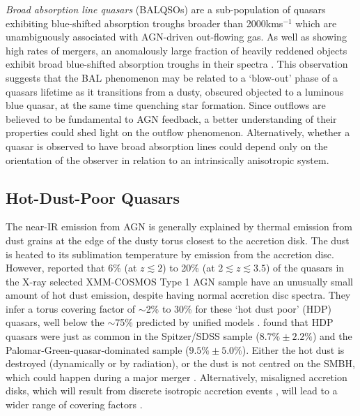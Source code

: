 {\it Broad absorption line quasars} (BALQSOs) are a sub-population of quasars exhibiting blue-shifted absorption troughs broader than 2000kms$^{-1}$ \citep{weymann91} which are unambiguously associated with AGN-driven out-flowing gas. 
As well as showing high rates of mergers, an anomalously large fraction of heavily reddened objects exhibit broad blue-shifted absorption troughs in their spectra \citep{urrutia09, glikman12}. 
This observation suggests that the BAL phenomenon may be related to a `blow-out' phase of a quasars lifetime as it transitions from a dusty, obscured objected to a luminous blue quasar, at the same time quenching star formation. Since outflows are believed to be fundamental to AGN feedback, a better understanding of their properties could shed light on the outflow phenomenon. 
Alternatively, whether a quasar is observed to have broad absorption lines could depend only on the orientation of the observer in relation to an intrinsically anisotropic system.

\subsection{Hot-Dust-Poor Quasars}

The near-IR emission from AGN is generally explained by thermal emission from dust grains at the edge of the dusty torus closest to the accretion disk. 
The dust is heated to its sublimation temperature \citep[1300-2000K][]{barvainis92} by emission from the accretion disc. However, \citet{hao10} reported that 6\% (at $z \lesssim 2$) to 20\% (at $2 \lesssim z \lesssim 3.5$) of the quasars in the X-ray selected XMM-COSMOS Type 1 AGN sample \citep{brusa10} have an unusually small amount of hot dust emission, despite having normal accretion disc spectra. 
They infer a torus covering factor of  $\sim$2\% to 30\% for these `hot dust poor' (HDP) quasars, well below the $\sim$75\% predicted by unified models \citep[e.g.][]{krolik88}. 
\citet{hao11} found that HDP quasars were just as common in the \citet{richards06} Spitzer/SDSS sample ($8.7\% \pm 2.2\%$) and the \citet{elvis94} Palomar-Green-quasar-dominated sample ($9.5\% \pm 5.0\%$). 
Either the hot dust is destroyed (dynamically or by radiation), or the dust is not centred on the SMBH, which could happen during a major merger \citep[e.g.][]{blecha11}. 
Alternatively, misaligned accretion disks, which will result from discrete isotropic accretion events \citep{volonteri07}, will lead to a wider range of covering factors \citep{lawrence10}. 

